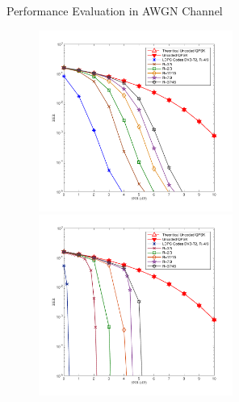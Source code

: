 \documentclass[11pt, aspectratio=169]{beamer}
\begin{document}
\begin{frame}{Performance Evaluation in AWGN Channel }
%
\vspace{-0.16cm}
\begin{figure}
	\centering
	\vspace{-0.25cm}
	\begin{minipage}{.5\linewidth}
		\hspace{1cm}
		\includegraphics[width=2.5in]{hasildsfix.pdf}
		\vspace{-0.5cm}
		
	\end{minipage}
	\hfill 	
	\hspace{ -1in}
	\begin{minipage}{.5\linewidth}
		\hspace{1cm}
		\includegraphics[width=2.5in]{hasiloriAWGN.pdf}
		

\end{minipage}
\end{figure}
\end{frame}
\end{document}
